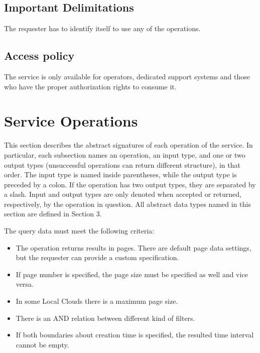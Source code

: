 \documentclass[a4paper]{arrowhead}
\begin{document}
\subsection{Important Delimitations}
\label{sec:delimitations}

The requester has to identify itself to use any of the operations.

\subsection{Access policy}
\label{sec:accesspolicy}

The service is only available for operators, dedicated support systems and those who have the proper authorization rights to consume it.

\newpage

\section{Service Operations}
\label{sec:functions}

This section describes the abstract signatures of each operation of the service. 
In particular, each subsection names an operation, an input type, and one or two output types (unsuccessful operations can return different structure), in that order.
The input type is named inside parentheses, while the output type is preceded by a colon. If the operation has two output types, they are separated by a slash.
Input and output types are only denoted when accepted or returned, respectively, by the operation in question. All abstract data types named in this section are defined in Section 3.

{}

The query data must meet the following criteria:

\begin{itemize}
    \item The operation returns results in pages. There are default page data settings, but the requester can provide a custom specification.
    \item If page number is specified, the page size must be specified as well and vice versa.
    \item In some Local Clouds there is a maximum page size.
    \item There is an AND relation between different kind of filters.
    \item If both boundaries about creation time is specified, the resulted time interval cannot be empty.
\end{itemize}
\end{document}
